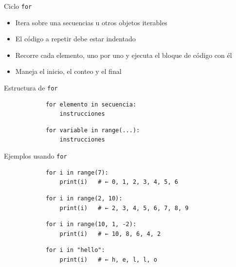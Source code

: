 \documentclass{beamer}
\begin{document}
    \begin{frame}{Ciclo \texttt{for}}
        \begin{itemize}
            \item Itera sobre una secuencias u otros objetos iterables
            \item El código a repetir debe estar indentado
            \item Recorre cada elemento, uno por uno y ejecuta el bloque de código con él
            \item Maneja el inicio, el conteo y el final
        \end{itemize}
    \end{frame}

    \begin{frame}[fragile,t]{Estructura de \texttt{for}}
        \begin{verbatim}
            for elemento in secuencia:
                instrucciones
        \end{verbatim}

        \begin{verbatim}
            for variable in range(...):
                instrucciones
        \end{verbatim}
    \end{frame}

    \begin{frame}[fragile,t]{Ejemplos usando \texttt{for}}
        \begin{verbatim}
            for i in range(7):
                print(i)   # ← 0, 1, 2, 3, 4, 5, 6
        \end{verbatim}
        \begin{verbatim}
            for i in range(2, 10):
                print(i)   # ← 2, 3, 4, 5, 6, 7, 8, 9
        \end{verbatim}
        \begin{verbatim}
            for i in range(10, 1, -2):
                print(i)   # ← 10, 8, 6, 4, 2
        \end{verbatim}
        \begin{verbatim}
            for i in "hello":
                print(i)   # ← h, e, l, l, o
        \end{verbatim}
    \end{frame}
\end{document}
